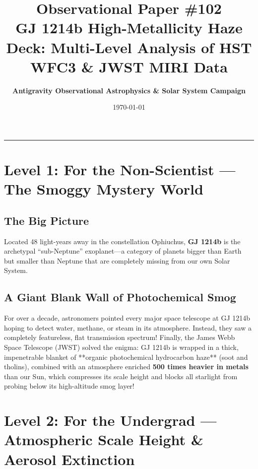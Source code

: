 \documentclass[11pt,a4paper]{article}
\title{\Huge \textbf{Observational Paper \#102}\\ \Large GJ 1214b High-Metallicity Haze Deck: Multi-Level Analysis of HST WFC3 \& JWST MIRI Data}
\author{\textbf{Antigravity Observational Astrophysics \& Solar System Campaign}}
\date{\today}
\begin{document}
\maketitle

\vspace{-1em}
\begin{center}
\rule{\textwidth}{1.5pt}
\end{center}

\section*{Level 1: For the Non-Scientist — The Smoggy Mystery World}

\subsection*{The Big Picture}
Located 48 light-years away in the constellation Ophiuchus, \textbf{GJ 1214b} is the archetypal ``sub-Neptune'' exoplanet—a category of planets bigger than Earth but smaller than Neptune that are completely missing from our own Solar System.

\subsection*{A Giant Blank Wall of Photochemical Smog}
For over a decade, astronomers pointed every major space telescope at GJ 1214b hoping to detect water, methane, or steam in its atmosphere. Instead, they saw a completely featureless, flat transmission spectrum! Finally, the James Webb Space Telescope (JWST) solved the enigma: GJ 1214b is wrapped in a thick, impenetrable blanket of **organic photochemical hydrocarbon haze** (soot and tholins), combined with an atmosphere enriched \textbf{500 times heavier in metals} than our Sun, which compresses its scale height and blocks all starlight from probing below its high-altitude smog layer!

\newpage

\section*{Level 2: For the Undergrad — Atmospheric Scale Height \& Aerosol Extinction}
\end{document}
